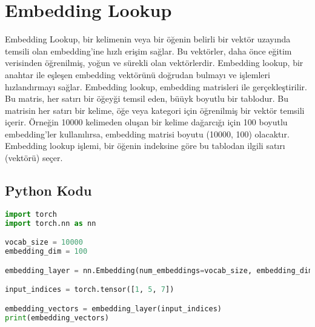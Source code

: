 \section{Embedding Lookup}

Embedding Lookup, bir kelimenin veya bir öğenin belirli bir vektör uzayında temsili olan embedding'ine hızlı erişim sağlar. Bu vektörler, daha önce eğitim verisinden öğrenilmiş, yoğun ve sürekli olan vektörlerdir. Embedding lookup, bir anahtar ile eşleşen embedding vektörünü doğrudan bulmayı ve işlemleri hızlandırmayı sağlar. Embedding lookup, embedding matrisleri ile gerçekleştirilir. Bu matris, her satırı bir öğeyği temsil eden, büüyk boyutlu bir tablodur. Bu matrisin her satırı bir kelime, öğe veya kategori için öğrenilmiş bir vektör temsili içerir. Örneğin 10000 kelimeden oluşan bir kelime dağarcığı için 100 boyutlu embedding'ler kullanılırsa, embedding matrisi boyutu (10000, 100) olacaktır. Embedding lookup işlemi, bir öğenin indeksine göre bu tablodan ilgili satırı (vektörü) seçer. 

\subsection{Python Kodu}

\begin{lstlisting}[language=Python]
import torch
import torch.nn as nn

vocab_size = 10000
embedding_dim = 100

embedding_layer = nn.Embedding(num_embeddings=vocab_size, embedding_dim=embedding_dim)

input_indices = torch.tensor([1, 5, 7])

embedding_vectors = embedding_layer(input_indices)
print(embedding_vectors)
\end{lstlisting}

\newpage